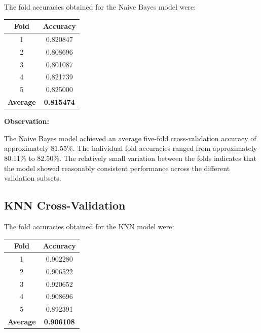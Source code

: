 \documentclass[12pt,a4paper]{article}
\begin{document}
The fold accuracies obtained for the Naive Bayes model were:

\begin{longtable}{|c|c|}
\hline
\textbf{Fold} & \textbf{Accuracy} \\ \hline

1 & 0.820847 \\ \hline

2 & 0.808696 \\ \hline

3 & 0.801087 \\ \hline

4 & 0.821739 \\ \hline

5 & 0.825000 \\ \hline

\textbf{Average} & \textbf{0.815474} \\ \hline

\end{longtable}

\textbf{Observation:}

The Naive Bayes model achieved an average five-fold cross-validation
accuracy of approximately 81.55\%. The individual fold accuracies
ranged from approximately 80.11\% to 82.50\%. The relatively small
variation between the folds indicates that the model showed reasonably
consistent performance across the different validation subsets.


\subsection{KNN Cross-Validation}

The fold accuracies obtained for the KNN model were:

\begin{longtable}{|c|c|}
\hline
\textbf{Fold} & \textbf{Accuracy} \\ \hline

1 & 0.902280 \\ \hline

2 & 0.906522 \\ \hline

3 & 0.920652 \\ \hline

4 & 0.908696 \\ \hline

5 & 0.892391 \\ \hline

\textbf{Average} & \textbf{0.906108} \\ \hline

\end{longtable}
\end{document}
